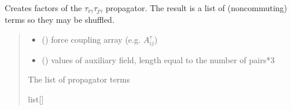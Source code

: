 \documentclass[letterpaper,10pt,english]{sphinxmanual}
\begin{document}
\begin{fulllineitems}

\begin{fulllineitems}
\label{\detokenize{spinbox:spinbox.core.HilbertPropagatorHS.factors_tau}}
\pysigstartsignatures
{}
\pysigstopsignatures
\sphinxAtStartPar
Creates factors of the \(\tau_{i\gamma}\tau_{j\gamma}\) propagator. 
The result is a list of (noncommuting) terms so they may be shuffled.
\begin{quote}\begin{description}
\begin{itemize}
\item {} 
\sphinxAtStartPar
{} ({\hyperref[\detokenize{spinbox:spinbox.core.Coupling}]{}}) \textendash{} force coupling array (e.g. \(A^{\tau}_{ij}\))

\item {} 
\sphinxAtStartPar
{} () \textendash{} values of auxiliary field, length equal to the number of pairs*3

\end{itemize}

\sphinxAtStartPar
The list of propagator terms

\sphinxAtStartPar
list{[}{\hyperref[\detokenize{spinbox:spinbox.core.HilbertOperator}]{}}{]}

\end{description}\end{quote}

\end{fulllineitems}



\end{fulllineitems}
\end{document}
